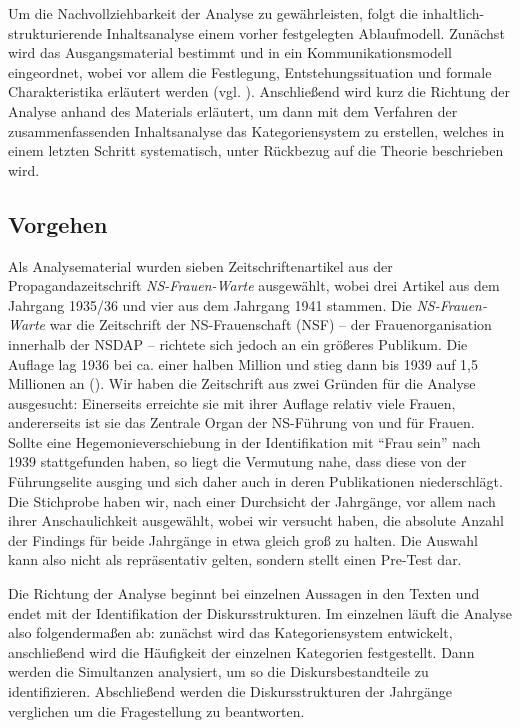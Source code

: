 \documentclass[12pt, titlepage=true, toc=bib]{scrartcl}
\begin{document}
Um die Nachvollziehbarkeit der Analyse zu gewährleisten, folgt die inhaltlich-strukturierende Inhaltsanalyse einem vorher festgelegten Ablaufmodell. Zunächst wird das Ausgangsmaterial bestimmt und in ein Kommunikationsmodell eingeordnet, wobei vor allem die Festlegung, Entstehungssituation und formale Charakteristika erläutert werden (vgl. \cite[52-53]{mayring_qualitative_2010}). Anschließend wird kurz die Richtung der Analyse anhand des Materials erläutert, um dann mit dem Verfahren der zusammenfassenden Inhaltsanalyse das Kategoriensystem zu erstellen, welches in einem letzten Schritt systematisch, unter Rückbezug auf die Theorie beschrieben wird.

\subsection{Vorgehen}

Als Analysematerial wurden sieben Zeitschriftenartikel aus der Propagandazeitschrift \textit{NS-Frauen-Warte} ausgewählt, wobei drei Artikel aus dem Jahrgang 1935/36 und vier aus dem Jahrgang 1941 stammen. Die \textit{NS-Frauen-Warte} war die Zeitschrift der NS-Frauenschaft (NSF) -- der Frauenorganisation innerhalb der NSDAP -- richtete sich jedoch an ein größeres Publikum. Die Auflage lag 1936 bei ca. einer halben Million und stieg dann bis 1939 auf 1,5 Millionen an (\cite[vgl.][89-90]{dohring_von_2004}). Wir haben die Zeitschrift aus zwei Gründen für die Analyse ausgesucht: Einerseits erreichte sie mit ihrer Auflage relativ viele Frauen, andererseits ist sie das Zentrale Organ der NS-Führung von und für Frauen. Sollte eine Hegemonieverschiebung in der Identifikation mit "`Frau sein"' nach 1939 stattgefunden haben, so liegt die Vermutung nahe, dass diese von der Führungselite ausging und sich daher auch in deren Publikationen niederschlägt. Die Stichprobe haben wir, nach einer Durchsicht der Jahrgänge, vor allem nach ihrer Anschaulichkeit ausgewählt, wobei wir versucht haben, die absolute Anzahl der Findings für beide Jahrgänge in etwa gleich groß zu halten. Die Auswahl kann also nicht als repräsentativ gelten, sondern stellt einen Pre-Test dar.

Die Richtung der Analyse beginnt bei einzelnen Aussagen in den Texten und endet mit der Identifikation der Diskursstrukturen. Im einzelnen läuft die Analyse also folgendermaßen ab: zunächst wird das Kategoriensystem entwickelt, anschließend wird die Häufigkeit der einzelnen Kategorien festgestellt. Dann werden die Simultanzen analysiert, um so die Diskursbestandteile zu identifizieren. Abschließend werden die Diskursstrukturen der Jahrgänge verglichen um die Fragestellung zu beantworten.
\end{document}
